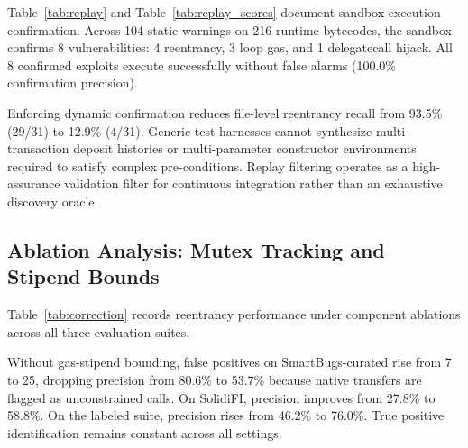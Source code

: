 \documentclass[pdflatex,sn-mathphys]{sn-jnl}
\theoremstyle{thmstyleone}
\theoremstyle{thmstyletwo}
\begin{document}
Table~\ref{tab:replay} and Table~\ref{tab:replay_scores} document sandbox execution confirmation. Across 104 static warnings on 216 runtime bytecodes, the sandbox confirms 8 vulnerabilities: 4 reentrancy, 3 loop gas, and 1 delegatecall hijack. All 8 confirmed exploits execute successfully without false alarms (100.0\% confirmation precision).

Enforcing dynamic confirmation reduces file-level reentrancy recall from 93.5\% (29/31) to 12.9\% (4/31). Generic test harnesses cannot synthesize multi-transaction deposit histories or multi-parameter constructor environments required to satisfy complex pre-conditions. Replay filtering operates as a high-assurance validation filter for continuous integration rather than an exhaustive discovery oracle.

\subsection{Ablation Analysis: Mutex Tracking and Stipend Bounds}\label{sec:results:ablation}

Table~\ref{tab:correction} records reentrancy performance under component ablations across all three evaluation suites.

\begin{table}[t]
\centering
\small
\caption{Reentrancy detection ablation: impact of sound gas-stipend bounds and slot-mutex tracking across benchmarks.}
\label{tab:correction}
\end{table}

Without gas-stipend bounding, false positives on SmartBugs-curated rise from 7 to 25, dropping precision from 80.6\% to 53.7\% %
because native transfers are flagged as unconstrained calls. On SolidiFI, precision improves from 27.8\% to 58.8\%. On the labeled suite, precision rises from 46.2\% to 76.0\%. True positive identification remains constant across all settings.
\end{document}
